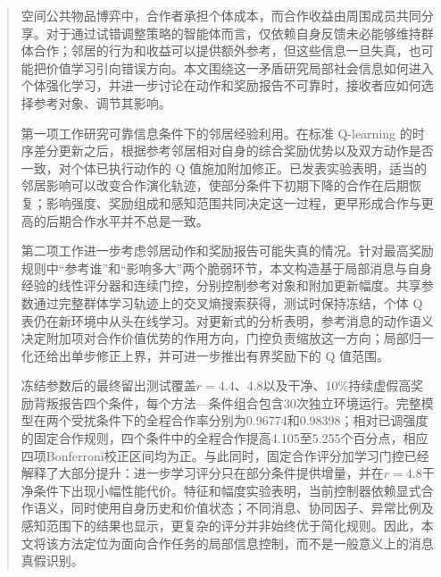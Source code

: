 \begin{abstract}
空间公共物品博弈中，合作者承担个体成本，而合作收益由周围成员共同分享。对于通过试错调整策略的智能体而言，仅依赖自身反馈未必能够维持群体合作；邻居的行为和收益可以提供额外参考，但这些信息一旦失真，也可能把价值学习引向错误方向。本文围绕这一矛盾研究局部社会信息如何进入个体强化学习，并进一步讨论在动作和奖励报告不可靠时，接收者应如何选择参考对象、调节其影响。

第一项工作研究可靠信息条件下的邻居经验利用。在标准 Q-learning 的时序差分更新之后，根据参考邻居相对自身的综合奖励优势以及双方动作是否一致，对个体已执行动作的 Q 值施加附加修正。已发表实验表明，适当的邻居影响可以改变合作演化轨迹，使部分条件下初期下降的合作在后期恢复；影响强度、奖励组成和感知范围共同决定这一过程，更早形成合作与更高的后期合作水平并不总是一致。

第二项工作进一步考虑邻居动作和奖励报告可能失真的情况。针对最高奖励规则中“参考谁”和“影响多大”两个脆弱环节，本文构造基于局部消息与自身经验的线性评分器和连续门控，分别控制参考对象和附加更新幅度。共享参数通过完整群体学习轨迹上的交叉熵搜索获得，测试时保持冻结，个体 Q 表仍在新环境中从头在线学习。对更新式的分析表明，参考消息的动作语义决定附加项对合作价值优势的作用方向，门控负责缩放这一方向；局部归一化还给出单步修正上界，并可进一步推出有界奖励下的 Q 值范围。

冻结参数后的最终留出测试覆盖$r=4.4$、4.8以及干净、10\%持续虚假高奖励背叛报告四个条件，每个方法—条件组合包含30次独立环境运行。完整模型在两个受扰条件下的全程合作率分别为0.96774和0.98398；相对已调强度的固定合作规则，四个条件中的全程合作提高4.105至5.255个百分点，相应四项Bonferroni校正区间均为正。与此同时，固定合作评分加学习门控已经解释了大部分提升：进一步学习评分只在部分条件提供增量，并在$r=4.8$干净条件下出现小幅性能代价。特征和幅度实验表明，当前控制器依赖显式合作语义，同时使用自身历史和价值状态；不同消息、协同因子、异常比例及感知范围下的结果也显示，更复杂的评分并非始终优于简化规则。因此，本文将该方法定位为面向合作任务的局部信息控制，而不是一般意义上的消息真假识别。
\end{abstract}

